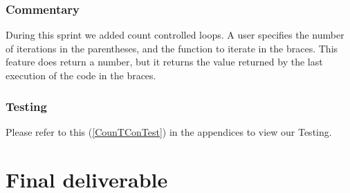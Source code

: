 \documentclass[a4paper, oneside, 11pt]{report}
\begin{document}
\subsection{Commentary}
During this sprint we added count controlled loops. A user specifies the number of iterations in the parentheses, and the function to iterate in the braces. This feature does return a number, but it returns the value returned by the last execution of the code in the braces. 

\subsection{Testing}
Please refer to this (\ref{CounTConTest}) in the appendices to view our Testing. \\


\clearpage
 



\chapter{Final deliverable}\label{Impl}
\end{document}

